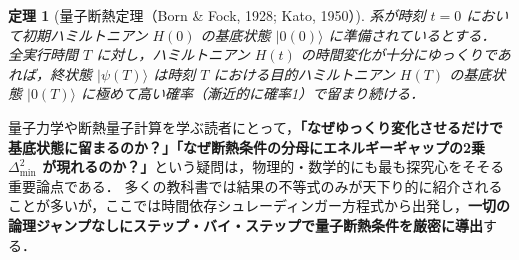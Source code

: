 \documentclass[11pt,a4paper,oneside,openany]{ltjsbook}
\theoremstyle{definition}
\theoremstyle{plain}
\newtheorem{theorem}{定理}[chapter]
\theoremstyle{remark}
\newcommand{\ket}[1]{|#1\rangle}
\begin{document}
\begin{theorem}[量子断熱定理（Born \& Fock, 1928; Kato, 1950）]
系が時刻 $t=0$ において初期ハミルトニアン $H(0)$ の基底状態 $\ket{0(0)}$ に準備されているとする．
全実行時間 $T$ に対し，ハミルトニアン $H(t)$ の時間変化が十分にゆっくりであれば，終状態 $\ket{\psi(T)}$ は時刻 $T$ における目的ハミルトニアン $H(T)$ の基底状態 $\ket{0(T)}$ に極めて高い確率（漸近的に確率1）で留まり続ける．
\end{theorem}

量子力学や断熱量子計算を学ぶ読者にとって，\textbf{「なぜゆっくり変化させるだけで基底状態に留まるのか？」「なぜ断熱条件の分母にエネルギーギャップの2乗 $\Delta_{\min}^2$ が現れるのか？」}という疑問は，物理的・数学的にも最も探究心をそそる重要論点である．
多くの教科書では結果の不等式のみが天下り的に紹介されることが多いが，ここでは時間依存シュレーディンガー方程式から出発し，\textbf{一切の論理ジャンプなしにステップ・バイ・ステップで量子断熱条件を厳密に導出}する．
\end{document}
